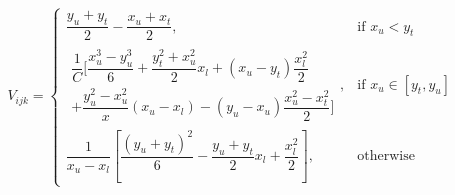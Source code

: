 \documentclass{article}
\begin{document}
	
	
	
	
	
	\begin{align*}
	V_{ijk} = \begin{cases}
		\dfrac{y_u +y_t}{2} - \dfrac{x_u+x_t}{2}, 			& \text{if $x_u < y_t$}\\[4ex]
		\begin{multlined}
			\dfrac{1}{C} \biggl[ \dfrac{x_u^3 - y_u^3}{6} + \dfrac{y_t^2 + x_u^2}{2} x_l + \left( x_u -y_t  \right)\dfrac{x_l^2}{2} \\
			+ \dfrac{y_u^2 - x_u^2}{x} \left( x_u - x_l \right)  - \left( y_u - x_u  \right) \dfrac{x_u^2 -x_t^2}{2}  \biggr] 	
		\end{multlined},  									& \text{if $x_u \in [y_t, y_u]$} \\[8ex]
		\dfrac{1}{x_u - x_l} \left[ \dfrac{(y_u + y_t)^2}{6} - \dfrac{y_u  + y_t}{2} x_l + \dfrac{x_l^2}{2}  \right], 					& \text{otherwise}
	\end{cases}
	\end{align*}
	
	
	
	
	
	
	
	
	
	
	
	
	
	
	
	
	
	
	
	
	
	
	
	
	
	
	
	
	
	
	
	
	
	
	
	 

	
\end{document}
